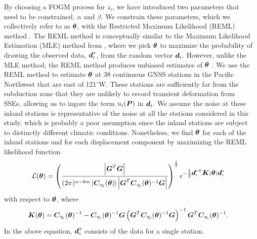 \documentclass[extra,mreferee]{gji}
\begin{document}
By choosing a FOGM process for $z_i$, we have introduced two
parameters that need to be constrained, $\alpha$ and $\beta$. We
constrain these parameters, which we collectively refer to as
$\mitbf{\theta}$, with the Restricted Maximum Likelihood (REML) method
\citep{Harville1974}. The REML method is conceptually similar to the
Maximum Likelihood Estimation (MLE) method from \citet{Langbein1997},
where we pick $\mitbf{\theta}$ to maximize the probability of drawing
the observed data, $\mitbf{d}_i^*$, from the random vector
$\mitbf{d}_i$. However, unlike the MLE method, the REML method
produces unbiased estimates of $\mitbf{\theta}$ \citep[sec.
2.6]{Cressie1992}. We use the REML method to estimate $\mitbf{\theta}$
at 38 continuous GNSS stations in the Pacific Northwest that are east
of 121$^\circ$W. These stations are sufficiently far from the
subduction zone that they are unlikely to record transient deformation
from SSEs, allowing us to ingore the term $u_i(\points)$ in
$\mitbf{d}_i$. We assume the noise at these inland stations is
representative of the noise at all the stations considered in this
study, which is probably a poor assumption since the inland stations
are subject to distinctly different climatic conditions. Nonetheless,
we find $\mitbf{\theta}$ for each of the inland stations and for each
displacement component by maximizing the REML likelihood function
\begin{equation}\label{eq:REMLNoise}
\mathcal{L}(\mitbf{\theta}) = \left(\frac{\left|\G^T\G\right|}{(2\pi)^{n-6m} 
                                    \left| \mitbf{C}_{\eta_i}(\mitbf{\theta}) \right| 
                                    \left| \G^T\mitbf{C}_{\eta_i}(\mitbf{\theta})^{-1}\G \right|}\right)^{\frac{1}{2}} 
                              e^{-\tfrac{1}{2}\data_i^{*T}\mitbf{K}(\mitbf{\theta})\data_i^*}
\end{equation}
with respect to $\mitbf{\theta}$, where
\begin{equation}
\mitbf{K}(\mitbf{\theta}) = \mitbf{C}_{\eta_i}(\mitbf{\theta})^{-1} - 
                            \mitbf{C}_{\eta_i}(\mitbf{\theta})^{-1}\G
                            \left(\G^T\mitbf{C}_{\eta_i}(\mitbf{\theta})^{-1}\G\right)^{-1}
                            \G^T\mitbf{C}_{\eta_i}(\mitbf{\theta})^{-1}.
\end{equation}
In the above equation, $\data^*_i$ consists of the data for a single station.

\end{document}
